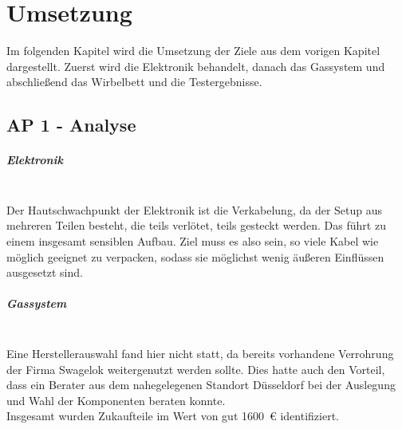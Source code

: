 \chapter{Umsetzung}

Im folgenden Kapitel wird die Umsetzung der Ziele aus dem vorigen Kapitel dargestellt. Zuerst wird die Elektronik behandelt, danach das Gassystem und abschließend das Wirbelbett und die Testergebnisse.


\section{AP 1 - Analyse}

\paragraph{Elektronik}
\hfill \\
Der Hautschwachpunkt der Elektronik ist die Verkabelung, da der Setup aus mehreren Teilen besteht, die teils verlötet, teils gesteckt werden. Das führt zu einem insgesamt sensiblen Aufbau. Ziel muss es also sein, so viele Kabel wie möglich geeignet zu verpacken, sodass sie möglichst wenig äußeren Einflüssen ausgesetzt sind. 


\paragraph{Gassystem}
\hfill \\
Eine Herstellerauswahl fand hier nicht statt, da bereits vorhandene Verrohrung der Firma Swagelok weitergenutzt werden sollte. Dies hatte auch den Vorteil, dass ein Berater aus dem nahegelegenen Standort Düsseldorf bei der Auslegung und Wahl der Komponenten beraten konnte. \\
Insgesamt wurden Zukaufteile im Wert von gut \SI{1600}{\euro} identifiziert. 


